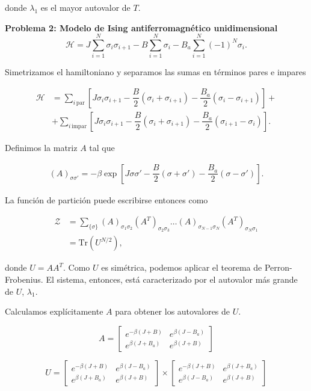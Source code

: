 \documentclass[10pt]{article}
\begin{document}
donde $\lambda_1$ es el mayor autovalor de $T$. 



\textbf{Problema 2: Modelo de Ising antiferromagn\'etico unidimensional}
\\

\begin{equation}
\mathcal{H} = J\sum_{i=1}^N \sigma_i \sigma_{i+1} - B \sum_{i=1}^N \sigma_i- B_a \sum_{i=1}^N (-1)^N \sigma_i.
\end{equation}

Simetrizamos el hamiltoniano y separamos las sumas en t\'erminos pares e impares

\begin{align}
\mathcal{H} &= \sum_{i\,\text{par}} \left[J \sigma_i \sigma_{i+1} - \dfrac{B}{2} \left( \sigma_i + \sigma_{i+1}\right) -\dfrac{B_a}{2} \left( \sigma_i - \sigma_{i+1}\right) \right] + \nonumber \\
&+ \sum_{i\,\text{impar}} \left[J \sigma_i \sigma_{i+1} - \dfrac{B}{2} \left( \sigma_i + \sigma_{i+1}\right) -\dfrac{B_a}{2} \left( \sigma_{i+1} - \sigma_i\right) \right].
\end{align}

Definimos la matriz $A$ tal que 

\begin{align*}
(A)_{\sigma\sigma'} = -\beta\exp\left[ J \sigma \sigma' - \dfrac{B}{2} \left( \sigma + \sigma'\right) -\dfrac{B_a}{2} \left( \sigma - \sigma'\right) \right].
\end{align*}

La funci\'on de partici\'on puede escribirse entonces como

\begin{align}
\mathcal{Z} &= \sum_{\lbrace\sigma\rbrace} (A)_{\sigma_1\sigma_2} (A^T)_{\sigma_2\sigma_3}\dots (A)_{\sigma_{N-1}\sigma_N} (A^T)_{\sigma_N\sigma_1} \nonumber \\
&= \text{Tr}\left( U^{N/2} \right),
\end{align}

donde $U=AA^T$. Como $U$ es sim\'etrica, podemos aplicar el teorema de Perron-Frobenius. El sistema, entonces, est\'a caracterizado por el autovalor m\'as grande de $U$, $\lambda_1$.

Calculamos expl\'icitamente $A$ para obtener los autovalores de $U$.

$$A = 
\begin{bmatrix}
e^{-\beta(J+B)} & e^{\beta(J-B_a)}\\
e^{\beta(J+B_a)} & e^{\beta(J+B)}
\end{bmatrix}
$$


$$U = 
\begin{bmatrix}
e^{-\beta(J+B)} & e^{\beta(J-B_a)}\\
e^{\beta(J+B_a)} & e^{\beta(J+B)}
\end{bmatrix}
\times
\begin{bmatrix}
e^{-\beta(J+B)} & e^{\beta(J+B_a)}\\
e^{\beta(J-B_a)} & e^{\beta(J+B)}
\end{bmatrix}
$$
\end{document}

